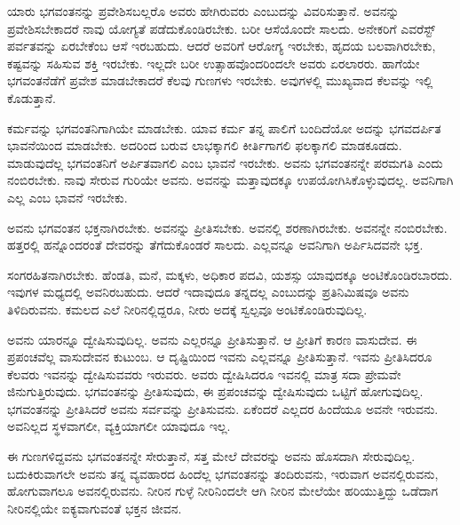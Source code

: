 ಯಾರು ಭಗವಂತನನ್ನು ಪ್ರವೇಶಿಸಬಲ್ಲರೊ ಅವರು ಹೇಗಿರುವರು ಎಂಬುದನ್ನು ವಿವರಿಸುತ್ತಾನೆ. ಅವನನ್ನು ಪ್ರವೇಶಿಸಬೇಕಾದರೆ ನಾವು ಯೋಗ್ಯತೆ ಪಡೆದುಕೊಂಡಿರಬೇಕು. ಬರೀ ಆಸೆಯೊಂದೇ ಸಾಲದು. ಅನೇಕರಿಗೆ ಎವರೆಸ್ಟ್ ಪರ್ವತವನ್ನು ಏರಬೇಕೆಂಬ ಆಸೆ ಇರಬಹುದು. ಆದರೆ ಅವರಿಗೆ ಆರೋಗ್ಯ ಇರಬೇಕು, ಹೃದಯ ಬಲವಾಗಿರಬೇಕು, ಕಷ್ಟವನ್ನು ಸಹಿಸುವ ಶಕ್ತಿ ಇರಬೇಕು. ಇಲ್ಲದೇ ಬರೀ ಉತ್ಸಾಹವೊಂದರಿಂದಲೇ ಅವರು ಏರಲಾರರು. ಹಾಗೆಯೇ ಭಗವಂತನೆಡೆಗೆ ಪ್ರವೇಶ ಮಾಡಬೇಕಾದರೆ ಕೆಲವು ಗುಣಗಳು ಇರಬೇಕು. ಅವುಗಳಲ್ಲಿ ಮುಖ್ಯವಾದ ಕೆಲವನ್ನು ಇಲ್ಲಿ ಕೊಡುತ್ತಾನೆ.

ಕರ್ಮವನ್ನು ಭಗವಂತನಿಗಾಗಿಯೇ ಮಾಡಬೇಕು. ಯಾವ ಕರ್ಮ ತನ್ನ ಪಾಲಿಗೆ ಬಂದಿ\-ದೆಯೋ ಅದನ್ನು ಭಗವದರ್ಪಿತ ಭಾವನೆಯಿಂದ ಮಾಡಬೇಕು. ಅದರಿಂದ ಬರುವ ಲಾಭಕ್ಕಾಗಲಿ ಕೀರ್ತಿಗಾಗಲಿ ಫಲಕ್ಕಾಗಲಿ ಮಾಡಕೂಡದು. ಮಾಡುವುದೆಲ್ಲ ಭಗವಂತನಿಗೆ ಅರ್ಪಿತವಾಗಲಿ ಎಂಬ ಭಾವನೆ ಇರಬೇಕು. ಅವನು ಭಗವಂತನನ್ನೇ ಪರಮಗತಿ ಎಂದು ನಂಬಿರಬೇಕು. ನಾವು ಸೇರುವ ಗುರಿಯೇ ಅವನು. ಅವನನ್ನು ಮತ್ತಾವುದಕ್ಕೂ ಉಪಯೋಗಿಸಿಕೊಳ್ಳುವುದಲ್ಲ. ಅವನಿಗಾಗಿ ಎಲ್ಲ ಎಂಬ ಭಾವನೆ ಇರಬೇಕು.

ಅವನು ಭಗವಂತನ ಭಕ್ತನಾಗಿರಬೇಕು. ಅವನನ್ನು ಪ್ರೀತಿಸಬೇಕು. ಅವನಲ್ಲಿ ಶರಣಾಗಿರಬೇಕು. ಅವನನ್ನೇ ನಂಬಿರಬೇಕು. ಹತ್ತರಲ್ಲಿ ಹನ್ನೊಂದರಂತೆ ದೇವರನ್ನು ತೆಗೆದುಕೊಂಡರೆ ಸಾಲದು. ಎಲ್ಲವನ್ನೂ ಅವನಿಗಾಗಿ ಅರ್ಪಿಸಿದವನೇ ಭಕ್ತ.

ಸಂಗರಹಿತನಾಗಿರಬೇಕು. ಹೆಂಡತಿ, ಮನೆ, ಮಕ್ಕಳು, ಅಧಿಕಾರ ಪದವಿ, ಯಶಸ್ಸು ಯಾವು\-ದಕ್ಕೂ ಅಂಟಿಕೊಂಡಿರಬಾರದು. ಇವುಗಳ ಮಧ್ಯದಲ್ಲಿ ಅವನಿರಬಹುದು. ಆದರೆ ಇದಾವುದೂ ತನ್ನದಲ್ಲ ಎಂಬುದನ್ನು ಪ್ರತಿನಿಮಿಷವೂ ಅವನು ತಿಳಿದಿರುವನು. ಕಮಲದ ಎಲೆ ನೀರಿನಲ್ಲಿದ್ದರೂ, ನೀರು ಅದಕ್ಕೆ ಸ್ವಲ್ಪವೂ ಅಂಟಿಕೊಂಡಿರುವುದಿಲ್ಲ.

ಅವನು ಯಾರನ್ನೂ ದ್ವೇಷಿಸುವುದಿಲ್ಲ. ಅವನು ಎಲ್ಲರನ್ನೂ ಪ್ರೀತಿಸುತ್ತಾನೆ. ಆ ಪ್ರೀತಿಗೆ ಕಾರಣ ವಾಸುದೇವ. ಈ ಪ್ರಪಂಚವೆಲ್ಲ ವಾಸುದೇವನ ಕುಟುಂಬ. ಆ ದೃಷ್ಟಿಯಿಂದ ಇವನು ಎಲ್ಲವನ್ನೂ ಪ್ರೀತಿಸುತ್ತಾನೆ. ಇವನು ಪ್ರೀತಿಸಿದರೂ ಕೆಲವರು ಇವನನ್ನು ದ್ವೇಷಿಸುವವರು ಇರುವರು. ಅವರು ದ್ವೇಷಿಸಿದರೂ ಇವನಲ್ಲಿ ಮಾತ್ರ ಸದಾ ಪ್ರೇಮವೇ ಜಿನುಗುತ್ತಿರುವುದು. ಭಗವಂತನನ್ನು ಪ್ರೀತಿಸುವುದು, ಈ ಪ್ರಪಂಚವನ್ನು ದ್ವೇಷಿಸುವುದು ಒಟ್ಟಿಗೆ ಹೋಗುವುದಿಲ್ಲ. ಭಗವಂತನನ್ನು ಪ್ರೀತಿಸಿದರೆ ಅವನು ಸರ್ವವನ್ನು ಪ್ರೀತಿಸುವನು. ಏಕೆಂದರೆ ಎಲ್ಲದರ ಹಿಂದೆಯೂ ಅವನೇ ಇರುವನು. ಅವನಿಲ್ಲದ ಸ್ಥಳವಾಗಲೀ, ವ್ಯಕ್ತಿಯಾಗಲೀ ಯಾವುದೂ ಇಲ್ಲ.

ಈ ಗುಣಗಳಿದ್ದವನು ಭಗವಂತನನ್ನೇ ಸೇರುತ್ತಾನೆ, ಸತ್ತ ಮೇಲೆ ದೇವರನ್ನು ಅವನು ಹೊಸದಾಗಿ ಸೇರುವುದಿಲ್ಲ. ಬದುಕಿರುವಾಗಲೇ ಅವನು ತನ್ನ ವ್ಯವಹಾರದ ಹಿಂದೆಲ್ಲ ಭಗವಂತನನ್ನು ತಂದಿರು\-ವನು, ಇರುವಾಗ ಅವನಲ್ಲಿರುವನು, ಹೋಗುವಾಗಲೂ ಅವನಲ್ಲಿರುವನು. ನೀರಿನ ಗುಳ್ಳೆ ನೀರಿನಿಂದಲೇ ಆಗಿ ನೀರಿನ ಮೇಲೆಯೇ ಹರಿಯುತ್ತಿದ್ದು ಒಡೆದಾಗ ನೀರಿನಲ್ಲಿಯೇ ಐಕ್ಯವಾಗುವಂತೆ ಭಕ್ತನ ಜೀವನ.


